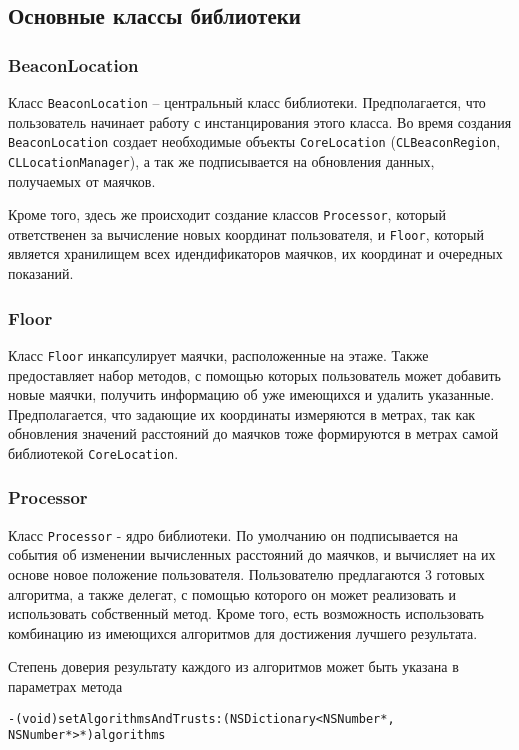 \subsection{Основные классы библиотеки}

\subsubsection{BeaconLocation}

Класс \texttt{BeaconLocation} – центральный класс библиотеки. Предполагается, что пользователь начинает работу с инстанцирования этого класса. Во время создания \texttt{BeaconLocation} создает необходимые объекты \texttt{CoreLoca\-tion} (\texttt{CLBeaconRegion}, \texttt{CLLocationManager}), а так же подписывается на обновления данных, получаемых от маячков.

Кроме того, здесь же происходит создание классов \texttt{Processor}, который ответственен за вычисление новых координат пользователя, и \texttt{Floor}, который является хранилищем всех идендификаторов маячков, их координат и очередных показаний.

\subsubsection{Floor}

Класс \texttt{Floor} инкапсулирует маячки, расположенные на этаже. Также пре\-до\-став\-ляет набор методов, с помощью которых пользователь может добавить новые маячки, получить информацию об уже имеющихся и удалить указанные. Предполагается, что задающие их координаты измеряются в метрах, так как обновления значений расстояний до маячков тоже формируются в метрах самой библиотекой \texttt{CoreLocation}.

\subsubsection{Processor}

Класс \texttt{Processor} - ядро библиотеки. По умолчанию он подписывается на события об изменении вычисленных расстояний до маячков, и вычисляет на их основе новое положение пользователя. 
Пользователю предлагаются 3 готовых алгоритма, а также делегат, с помощью которого он может реализовать и использовать собственный метод. Кроме того, есть возможность использовать комбинацию из имеющихся алгоритмов для достижения лучшего результата.

Степень доверия результату каждого из алгоритмов может быть указана в параметрах метода \\
\begin{small}
\texttt{-(void)setAlgorithmsAndTrusts:(NSDictionary<NSNumber*, NSNumber*>*)algorithms}
\end{small}


